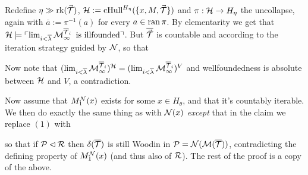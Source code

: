 \documentclass[../main]{subfiles}
\begin{document}
{  \qquad Redefine $\eta\gg\rk(\vec\T)$,
  $\h:=\chull^{H_\eta}(\{x,M,\vec\T\})$ and $\pi:\h\to H_\eta$ the
  uncollapse, again with $\overline a:=\pi^{-1}(a)$ for every
  $a\in\ran\pi$. By elementarity we get that
  $\h\models\godel{\lim_{i<\overline\lambda}\M^{\overline\T_i}_\infty\text{ is illfounded}}$. But $\overline{\vec\T}$ is countable and
  according to the iteration strategy guided by $\N$, so that
  
  Now note that
  $(\lim_{i<\overline\lambda}\M^{\overline\T_i}_\infty)^{\h}=(\lim_{i<\overline\lambda}\M^{\overline\T_i}_\infty)^V$
  and wellfoundedness is absolute between $\h$ and $V$, a
  contradiction.
    
  \qquad Now assume that $M_1^{\N}(x)$ exists for some
  $x\in H_\theta$, and that it's countably iterable. We then do
  exactly the same thing as with $\N(x)$ \textit{except} that in the
  claim we replace $(1)$ with

  so that if $\P\pinit\R$ then $\delta(\overline\T)$ is still Woodin
  in $\P=\N(\M(\overline\T))$, contradicting the defining property of
  $M_1^{\N}(x)$ (and thus also of $\R$). The rest of the proof is a
  copy of the above.
  }
\end{document}
